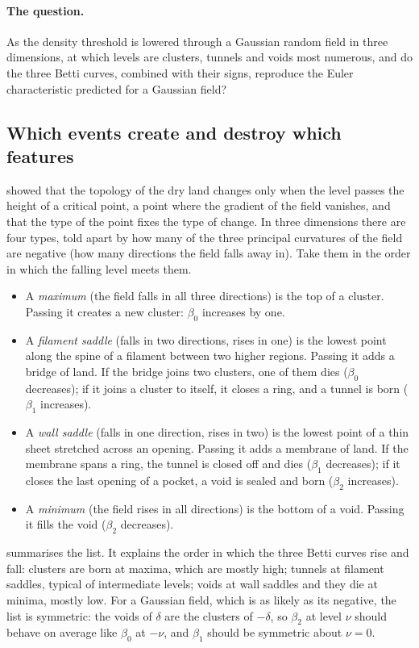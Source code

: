 \paragraph{The question.} As the density threshold is lowered through a Gaussian random field in three dimensions, at
which levels are clusters, tunnels and voids most numerous, and do the three Betti curves, combined with their signs,
reproduce the Euler characteristic predicted for a Gaussian field?

\subsection{Which events create and destroy which features}
\label{12b:sec:events}

 showed that the topology of the dry land changes only when the level passes the height of a
critical point, a point where the gradient of the field vanishes, and that the type of the point fixes the type of
change. In three dimensions there are four types, told apart by how many of the three principal curvatures of the
field are negative (how many directions the field falls away in). Take them in the order in which the falling level
meets them.
\begin{itemize}[itemsep=1pt,leftmargin=1.2em]
  \item A \emph{maximum} (the field falls in all three directions) is the top of a cluster. Passing it creates a new
        cluster: $\beta_0$ increases by one.
  \item A \emph{filament saddle} (falls in two directions, rises in one) is the lowest point along the spine of a
        filament between two higher regions. Passing it adds a bridge of land. If the bridge joins two clusters, one of
        them dies ($\beta_0$ decreases); if it joins a cluster to itself, it closes a ring, and a tunnel is born
        ($\beta_1$ increases).
  \item A \emph{wall saddle} (falls in one direction, rises in two) is the lowest point of a thin sheet stretched
        across an opening. Passing it adds a membrane of land. If the membrane spans a ring, the tunnel is closed off
        and dies ($\beta_1$ decreases); if it closes the last opening of a pocket, a void is sealed and born ($\beta_2$
        increases).
  \item A \emph{minimum} (the field rises in all directions) is the bottom of a void. Passing it fills the void
        ($\beta_2$ decreases).
\end{itemize}
 summarises the list. It explains the order in which the three Betti curves rise and fall:
clusters are born at maxima, which are mostly high; tunnels at filament saddles, typical of intermediate levels;
voids at wall saddles and they die at minima, mostly low. For a Gaussian field, which is as likely as its negative,
the list is symmetric: the voids of $\delta$ are the clusters of $-\delta$, so $\beta_2$ at level $\nu$ should
behave on average like $\beta_0$ at $-\nu$, and $\beta_1$ should be symmetric about $\nu=0$.

